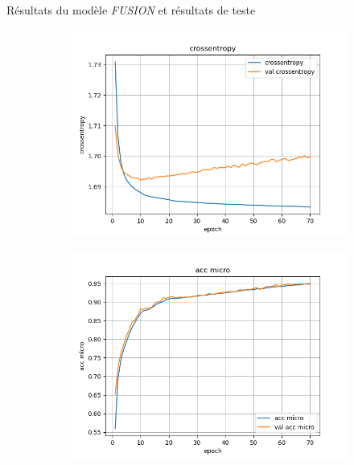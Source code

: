 \documentclass[11pt]{beamer}
\begin{document}
\begin{frame}{Résultats du modèle \textit{FUSION} et résultats de teste}
    \begin{figure}
        \centering
        \begin{subfigure}{0.32\textwidth}
            \centering
            \includegraphics[width=\linewidth]{../logs/fusion/crossentropy.png}
        \end{subfigure}
        \begin{subfigure}{0.32\textwidth}
            \centering
            \includegraphics[width=\linewidth]{../logs/fusion/acc micro.png}
        \end{subfigure}
        \begin{subfigure}{0.32\textwidth}

\end{subfigure}
\end{figure}
\end{frame}
\end{document}
